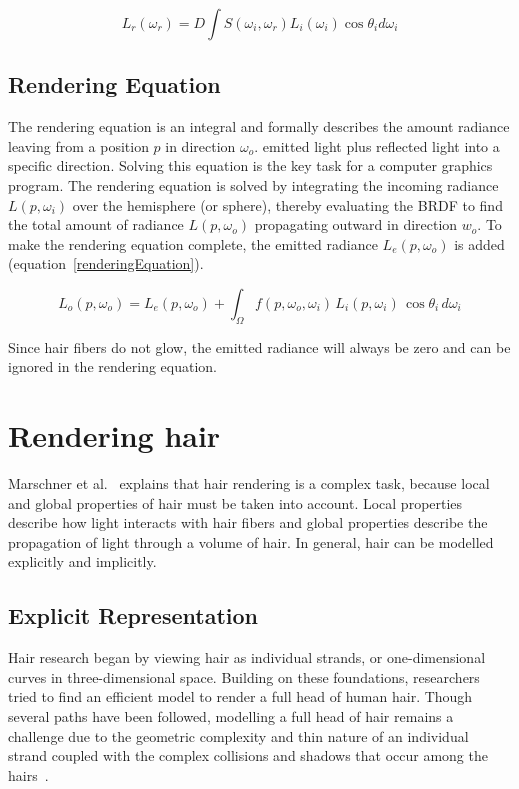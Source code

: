 \documentclass[11pt,a4paper]{report}
\begin{document}
\begin{equation}
L_r(\omega_r) = D \int S(\omega_i, \omega_r) L_i(\omega_i) \cos \theta_i d \omega_i
\end{equation}


\subsection{Rendering Equation}
The rendering equation is an integral and formally describes the amount radiance leaving from a position $p$ in direction $\omega_o$. emitted light plus reflected light into a specific direction. Solving this equation is the key task for a computer graphics program. The rendering equation is solved by integrating the incoming radiance $L(p, \omega_i)$ over the hemisphere (or sphere), thereby evaluating the BRDF to find the total amount of radiance $L(p, \omega_o)$ propagating outward in direction $w_o$. To make the rendering equation complete, the emitted radiance $L_e(p, \omega_o)$ is added (equation~\ref{renderingEquation}).

\begin{equation}
L_o(p, \omega_o) = L_e(p, \omega_o) + \int_{\Omega} f(p, \omega_o, \omega_i)\, L_i(p, \omega_i)\, \cos \theta_i\, d\omega_i
\label{renderingEquation}
\end{equation}

Since hair fibers do not glow, the emitted radiance will always be zero and can be ignored in the rendering equation.

\section{Rendering hair}

Marschner et al.~\cite{marschner} explains that hair rendering is a complex task, because local and global properties of hair must be taken into account. Local properties describe how light interacts with hair fibers and global properties describe the propagation of light through a volume of hair. In general, hair can be modelled explicitly and implicitly.

\subsection{Explicit Representation}

Hair research began by viewing hair as individual strands, or one-dimensional curves in three-dimensional space. Building on these foundations, researchers tried to find an efficient model to render a full head of human hair. Though several paths have been followed, modelling a full head of hair remains a challenge due to the geometric complexity and thin nature of an individual strand coupled with the complex collisions and shadows that occur among the hairs~\cite{ward}.
\end{document}
